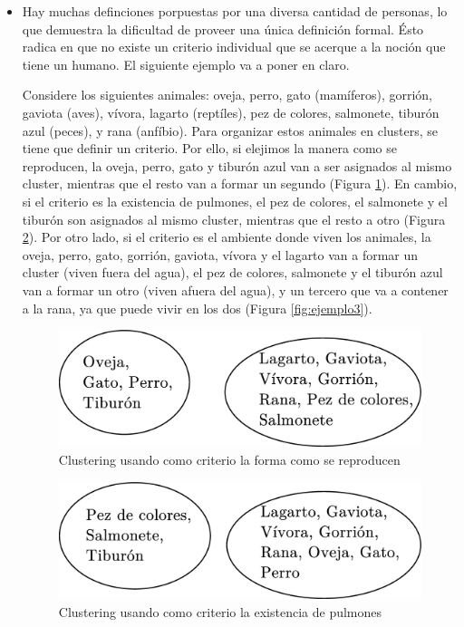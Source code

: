 \begin{itemize}

\item Hay muchas definciones porpuestas por una diversa cantidad de personas,
 lo que demuestra la dificultad de proveer una \'unica definici\'on formal. Ésto radica en que
no existe un criterio individual que se acerque a la noci\'on que tiene un humano. 
El siguiente ejemplo va a poner en claro.

Considere los siguientes animales: oveja, perro, gato (mam\'iferos), gorri\'on, gaviota (aves),
v\'ivora, lagarto (rept\'iles), pez de colores, salmonete, tibur\'on azul (peces), y rana (anf\'ibio).
Para organizar estos animales en clusters, se tiene que definir un criterio. Por ello, si 
elejimos la manera como se reproducen, la oveja, perro, gato
y tibur\'on azul van a ser asignados al mismo cluster, mientras que el resto van a formar un segundo
(Figura \ref{fig:ejemplo1}).  En cambio, si el criterio es la existencia de pulmones, 
el pez de colores, el salmonete y el tibur\'on son
asignados al mismo cluster, mientras que el resto a otro (Figura \ref{fig:ejemplo2}).
Por otro lado, si el criterio es el ambiente
donde viven los animales, la oveja, perro, gato, gorri\'on, gaviota, v\'ivora y el lagarto van a formar un cluster
(viven fuera del agua), el pez de colores, salmonete y el tibur\'on azul van a formar un otro (viven afuera
del agua), y un tercero que va a contener a la rana, ya que puede vivir en los dos (Figura \ref{fig:ejemplo3}). 

\begin{figure}[htb]
\centering
\includegraphics[scale=0.3]{figures/ejemplo1.eps}
\caption{Clustering usando como criterio la forma como se reproducen}
\label{fig:ejemplo1}
\end{figure}

\begin{figure}[htb]
\centering
\includegraphics[scale=0.3]{figures/ejemplo2.eps}
\caption{Clustering usando como criterio la existencia de pulmones}
\label{fig:ejemplo2}
\end{figure}


\end{itemize}
